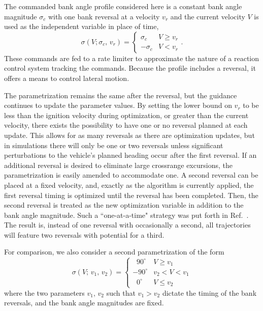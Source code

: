 The commanded bank angle profile considered here is a constant bank angle magnitude $\sigma_c$ with one bank reversal at a velocity $v_r$ and the current velocity $V$ is used as the independent variable in place of time,
\begin{equation}
\sigma(V; \sigma_c, \,v_r) = \left\{
\begin{array}{ll}
\sigma_c & V\geq v_r \\
-\sigma_c & V < v_r
\end{array} 
\right. .
\end{equation}
These commands are fed to a rate limiter to approximate the nature of a reaction control system tracking the commands. Because the profile includes a reversal, it offers a means to control lateral motion. 

The parametrization remains the same after the reversal, but the guidance continues to update the parameter values. By setting the lower bound on $v_r$ to be less than the ignition velocity during optimization, or greater than the current velocity, there exists the possibility to have one or no reversal planned at each update. This allows for as many reversals as there are optimization updates, but in simulations there will only be one or two reversals unless significant perturbations to the vehicle's planned heading occur after the first reversal. If an additional reversal is desired to eliminate large crossrange excursions, the parametrization is easily amended to accommodate one. A second reversal can be placed at a fixed velocity, and, exactly as the algorithm is currently applied, the first reversal timing is optimized until the reversal has been completed. Then, the second reversal is treated as the new optimization variable in addition to the bank angle magnitude. Such a ``one-at-a-time" strategy was put forth in Ref.~\cite{GuangfeiReplanning}. The result is, instead of one reversal with occasionally a second, all trajectories will feature two reversals with potential for a third. 

For comparison, we also consider a second parametrization of the form 
\begin{equation}
\sigma(V; \,v_1, \,v_2) = \left\{
\begin{array}{ll}
\;\;90^{\circ} & V\geq v_1 \\
-90^{\circ} & v_2 < V < v_1 \\
\;\;0^{\circ} & V \le v_2
\end{array} 
\right.
\end{equation}
where the two parameters $v_1,\, v_2$ such that $v_1 > v_2$ dictate the timing of the bank reversals, and the bank angle magnitudes are fixed.


